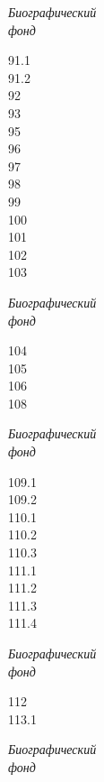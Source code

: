\documentclass{article}
\begin{document}
\fontsize{60}{72}\selectfont

\newcommand{\romannum}[1]{{\vspace*{\fill}\fontsize{80}{100}\selectfont{#1}}}

\newcommand{\bftitle}[0]{{\fontsize{60}{72}\selectfont \itshape{Биографический \\ фонд}\vspace*{\fill}}}


\bftitle
\begin{multicols}{3}
91.1\\
91.2\\
92\\
93\\
95\\
96\\
97\\
98\\
99\\
100\\
101\\
102\\
103\\
\end{multicols}
\romannum{XVII}

\newpage

\bftitle

104\\
105\\
106\\
108\\
\romannum{XVIII}

\newpage

\bftitle
\begin{multicols}{2}
109.1\\
109.2\\
110.1\\
110.2\\
110.3\\
111.1\\
111.2\\
111.3\\
111.4\\
\end{multicols}
\romannum{XIX}

\newpage

\bftitle

112\\
113.1\\
\romannum{XX}

\newpage

\bftitle
\end{document}
